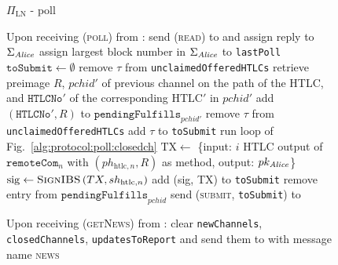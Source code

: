   \begin{figure}[H]
    \begin{protocolbox}{$\Pi_{\mathrm{LN}}$ - poll}
      \begin{algorithmic}[1]
        \State Upon receiving (\textsc{poll}) from \environment:
        \Indent
          \State send (\textsc{read}) to \ledger{} and assign reply to
          $\Sigma_{\mathit{Alice}}$
          \label{alg:protocol:poll:read}
          \State assign largest block number in $\Sigma_{\mathit{Alice}}$ to
          \texttt{lastPoll}
          \label{alg:protocol:poll:afterread}
        \State $\mathtt{toSubmit} \gets \emptyset$
             
              \State remove $\tau$ from \texttt{unclaimedOfferedHTLCs}
                \State retrieve preimage $R$, $\mathit{pchid}'$ of previous
                channel on the path of the HTLC, and $\mathtt{HTLCNo}'$ of the
                corresponding $\mathrm{HTLC}'$ in $\mathit{pchid}'$
                \State add $\left(\mathtt{HTLCNo}', R\right)$ to
                $\mathtt{pendingFulfills}_{\mathit{pchid}'}$
              \EndIf
              \State remove $\tau$ from \texttt{unclaimedOfferedHTLCs}
              \State add $\tau$ to \texttt{toSubmit}
            \EndIf
          \EndFor
          \State run loop of Fig.~\ref{alg:protocol:poll:closedch}
                \State $\mathrm{TX} \gets$ \{input: $i$ HTLC output of
                $\mathtt{remoteCom}_n$ with $\left(ph_{\mathrm{htlc}, n},
                R\right)$ as method, output: $pk_{\mathit{Alice}}$\}
                \State $\mathrm{sig} \gets \textsc{SignIBS}\left(TX,
                sh_{\mathrm{htlc}, n}\right)$
                \State add (sig, TX) to \texttt{toSubmit}
                \State remove entry from
                $\mathtt{pendingFulfills}_{\mathit{pchid}}$
              \EndIf
            \EndFor
          \EndFor
          \label{alg:protocol:poll:beforesubmit}
          \State send (\textsc{submit}, \texttt{toSubmit}) to \ledger
          \label{alg:protocol:poll:submit}
        \EndIndent
        \Statex

        \State Upon receiving (\textsc{getNews}) from \alice:
        \label{alg:protocol:getnews}
        \Indent
          \State clear \texttt{newChannels}, \texttt{closedChannels},
          \texttt{updatesToReport} and send them to \alice{} with message name
          \textsc{news}
          \label{alg:protocol:getnews:send}
        \EndIndent
      \end{algorithmic}
    \end{protocolbox}
    \caption{}
    \label{alg:protocol:poll}
  \end{figure}

